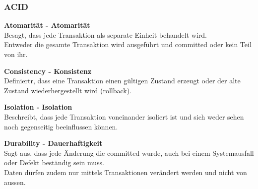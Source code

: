 
\subsubsection{ACID}
\label{chap:acid}
    \begin{description}
        \item \textbf{Atomarität - Atomarität}\hfill \\Besagt, dass jede \Gls{Transaktion} als separate Einheit behandelt wird.\\Entweder die gesamte Transaktion wird ausgeführt und committed oder kein Teil von ihr.
        \item \textbf{Consistency - Konsistenz}\hfill \\Definiertr, dass eine \Gls{Transaktion} einen gültigen Zustand erzeugt oder der alte Zustand wiederhergestellt wird (rollback).
        \item \textbf{Isolation - Isolation}\hfill \\Beschreibt, dass jede Transaktion voneinander isoliert ist und sich weder sehen noch gegenseitig beeinflussen können.
        \item \textbf{Durability - Dauerhaftigkeit}\hfill \\Sagt aus, dass jede Änderung die committed wurde, auch bei einem Systemausfall oder Defekt beständig sein muss.\\Daten dürfen zudem nur mittels Transaktionen verändert werden und nicht von aussen.
    \end{description}
